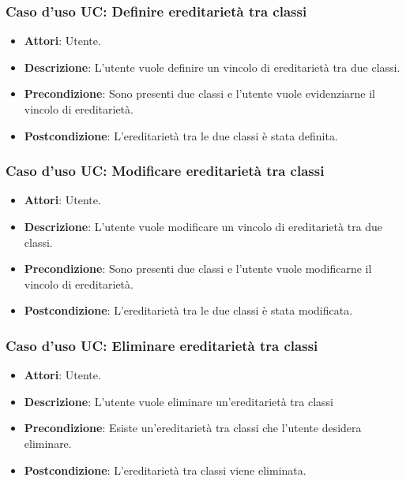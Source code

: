 \documentclass[../AnalisiDeiRequisiti.tex]{subfiles}
\begin{document}
		\subsubsection{Caso d'uso UC: Definire ereditarietà tra classi}
		\begin{itemize}
			\item\textbf{Attori}: Utente.
			\item\textbf{Descrizione}: L'utente vuole definire un vincolo di ereditarietà tra due classi.
			\item\textbf{Precondizione}: Sono presenti due classi e l'utente vuole evidenziarne il vincolo di ereditarietà.
			\item\textbf{Postcondizione}: L'ereditarietà tra le due classi è stata definita.
		\end{itemize}
		
		\subsubsection{Caso d'uso UC: Modificare ereditarietà tra classi}
		\begin{itemize}
			\item\textbf{Attori}: Utente.
			\item\textbf{Descrizione}: L'utente vuole modificare un vincolo di ereditarietà tra due classi.
			\item\textbf{Precondizione}: Sono presenti due classi e l'utente vuole modificarne il vincolo di ereditarietà.
			\item\textbf{Postcondizione}: L'ereditarietà tra le due classi è stata modificata.
		\end{itemize}
		
		\subsubsection{Caso d'uso UC: Eliminare ereditarietà tra classi}
		\begin{itemize}
			\item\textbf{Attori}: Utente.
			\item\textbf{Descrizione}: L'utente vuole eliminare un'ereditarietà tra classi
			\item\textbf{Precondizione}: Esiste un'ereditarietà tra classi che l'utente desidera eliminare.
			\item\textbf{Postcondizione}: L'ereditarietà tra classi viene eliminata.
		\end{itemize}
		
\end{document}
